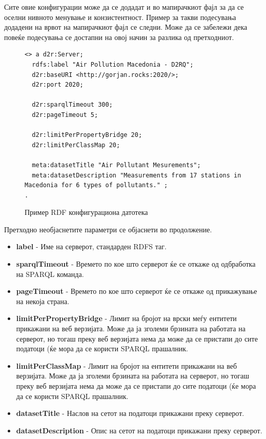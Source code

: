 \documentclass{uvamscse}
\begin{document}
Сите овие конфигурации може да се додадат и во мапирачкиот фајл за да се оселни нивното менување и конзистентност. Пример за такви подесувања додадени на врвот на мапирачкиот фајл се следни. Може да се забележи дека повеќе подесувања се достапни на овој начин за разлика од претходниот.

\begin{figure}[H]
\centering
\begin{snippet}
\begin{verbatim}
<> a d2r:Server;
  rdfs:label "Air Pollution Macedonia - D2RQ";
  d2r:baseURI <http://gorjan.rocks:2020/>;
  d2r:port 2020;
  
  d2r:sparqlTimeout 300;
  d2r:pageTimeout 5;

  d2r:limitPerPropertyBridge 20;
  d2r:limitPerClassMap 20;

  meta:datasetTitle "Air Pollutant Mesurements";
  meta:datasetDescription "Measurements from 17 stations in Macedonia for 6 types of pollutants." ;
.
\end{verbatim}
\end{snippet}
\caption{Пример RDF конфигурациона датотека}
\label{fig:conf}
\end{figure}

Претходно необјаснетите параметри се објаснети во продолжение.

\begin{itemize}
\item \textbf{label} - Име на серверот, стандарден RDFS таг.
\item \textbf{sparqlTimeout} - Времето по кое што серверот ќе се откаже од одбработка на SPARQL команда.
\item \textbf{pageTimeout} - Времето по кое што серверот ќе се откаже од прикажување на некоја страна.
\item \textbf{limitPerPropertyBridge} - Лимит на бројот на врски меѓу ентитети прикажани на веб верзијата. Може да ја зголеми брзината на работата на серверот, но тогаш преку веб верзијата нема да може да се пристапи до сите податоци (ќе мора да се користи SPARQL прашалник.
\item \textbf{limitPerClassMap} - Лимит на бројот на ентитети прикажани на веб верзијата. Може да ја зголеми брзината на работата на серверот, но тогаш преку веб верзијата нема да може да се пристапи до сите податоци (ќе мора да се користи SPARQL прашалник.
\item \textbf{datasetTitle} - Наслов на сетот на податоци прикажани преку серверот.
\item \textbf{datasetDescription} - Опис на сетот на податоци прикажани преку серверот.

\end{itemize}
\end{document}
